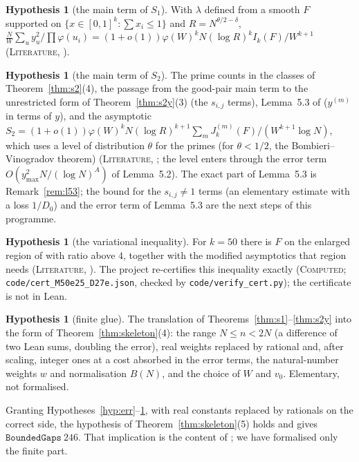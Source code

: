 \documentclass[11pt]{amsart}
\theoremstyle{definition}
\newtheorem{hypothesis}[theorem]{Hypothesis}
\theoremstyle{remark}
\newcommand{\lbl}[1]{\textup{\textsc{#1}}}
\newcommand{\tl}[1]{\texttt{#1}}
\begin{document}
\begin{hypothesis}[the main term of $S_1$]\label{hyp:s1}
With $\lambda$ defined from a smooth $F$ supported on
$\{x\in[0,1]^k:\sum x_i\le1\}$ and $R=N^{\theta/2-\delta}$,
$\frac NW\sum_u y_u^2/\prod\varphi(u_i)=(1+o(1))\varphi(W)^kN(\log R)^kI_k(F)/W^{k+1}$
(\lbl{Literature}, \cite[Prop.~4.1, Lemmas~5.1 and~6.2]{May15}).
\end{hypothesis}

\begin{hypothesis}[the main term of $S_2$]\label{hyp:s2}
The prime counts in the classes of Theorem~\ref{thm:s2}(4), the passage from
the good-pair main term to the unrestricted form of Theorem~\ref{thm:s2y}(3) (the $s_{i,j}$ terms),
Lemma~5.3 of \cite{May15} ($y^{(m)}$ in terms of $y$), and the asymptotic
$S_2=(1+o(1))\varphi(W)^kN(\log R)^{k+1}\sum_mJ^{(m)}_k(F)/(W^{k+1}\log N)$,
which uses a level of distribution $\theta$ for the primes (for $\theta<1/2$,
the Bombieri--Vinogradov theorem) (\lbl{Literature}, \cite[Prop.~4.1, Lemmas~5.2 and~6.3]{May15}; the level enters through the error term $O(y_{\max}^2N/(\log N)^A)$ of Lemma~5.2).
The exact part of Lemma~5.3 is Remark~\ref{rem:l53}; the bound for the $s_{i,j}\ne1$ terms (an elementary
estimate with a loss $1/D_0$) and the error term of Lemma~5.3 are the next steps of this programme.
\end{hypothesis}

\begin{hypothesis}[the variational inequality]\label{hyp:var}
For $k=50$ there is $F$ on the enlarged region of \cite{Pol14b} with ratio above
$4$, together with the modified asymptotics that region needs
(\lbl{Literature}, \cite{Pol14b}). The project re-certifies this inequality
exactly (\lbl{Computed}; \tl{code/cert\_M50e25\_D27e.json}, checked by
\tl{code/verify\_cert.py}); the certificate is not in Lean.
\end{hypothesis}

\begin{hypothesis}[finite glue]\label{hyp:glue}
The translation of Theorems~\ref{thm:s1}--\ref{thm:s2y} into the form of
Theorem~\ref{thm:skeleton}(4): the range $N\le n<2N$ (a difference of two Lean
sums, doubling the error), real weights replaced by rational and, after
scaling, integer ones at a cost absorbed in the error terms, the natural-number
weights $w$ and normalisation $B(N)$, and the choice of $W$ and $v_0$. Elementary,
not formalised.
\end{hypothesis}

\noindent Granting Hypotheses~\ref{hyp:err}--\ref{hyp:glue}, with real constants
replaced by rationals on the correct side, the hypothesis of
Theorem~\ref{thm:skeleton}(5) holds and gives $\tl{BoundedGaps}\ 246$. That
implication is the content of \cite{May15,Pol14b}; we have formalised only the
finite part.
\end{document}
